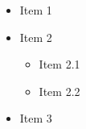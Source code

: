 
\begin{itemize}
    \item Item 1
    \item Item 2
    \begin{itemize}
        \item Item 2.1
        \item Item 2.2
    \end{itemize}
    \item Item 3
\end{itemize}